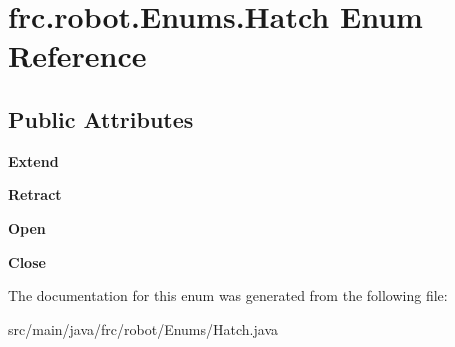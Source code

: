 \hypertarget{enumfrc_1_1robot_1_1_enums_1_1_hatch}{}\section{frc.\+robot.\+Enums.\+Hatch Enum Reference}
\label{enumfrc_1_1robot_1_1_enums_1_1_hatch}
\subsection*{Public Attributes}
\begin{DoxyCompactItemize}
\item 
\mbox{\label{enumfrc_1_1robot_1_1_enums_1_1_hatch_aa9182f52be77e783bb38e7cfbf5bb700}} 
{\bfseries Extend}
\item 
\mbox{\label{enumfrc_1_1robot_1_1_enums_1_1_hatch_ac4881a7e4ca2bc7c64aa8acd0da91d6e}} 
{\bfseries Retract}
\item 
\mbox{\label{enumfrc_1_1robot_1_1_enums_1_1_hatch_aba378e125bbd0e4206aa27ab9bc51b0b}} 
{\bfseries Open}
\item 
\mbox{\label{enumfrc_1_1robot_1_1_enums_1_1_hatch_ad9de6151d633f63ba3cb50aaeba1afd0}} 
{\bfseries Close}
\end{DoxyCompactItemize}


The documentation for this enum was generated from the following file\+:\begin{DoxyCompactItemize}
\item 
src/main/java/frc/robot/\+Enums/Hatch.\+java\end{DoxyCompactItemize}
